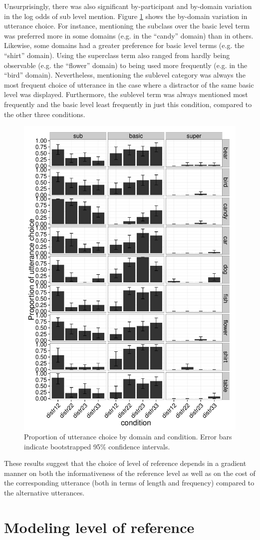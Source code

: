 \documentclass[10pt,letterpaper]{article}
\newcommand{\figref}[1]{Figure \ref{#1}}
\begin{document}
Unsurprisingly, there was also significant by-participant and by-domain variation in the log odds of sub level mention. \figref{fig:domains} shows the by-domain variation in utterance choice. For instance, mentioning the subclass over the basic level term was preferred more in some domains (e.g. in the ``candy'' domain) than in others. Likewise, some domains had a greater preference for basic level terms (e.g. the ``shirt'' domain). Using the superclass term also ranged from hardly being observable (e.g. the ``flower'' domain) to being used more frequently (e.g. in the ``bird'' domain). Nevertheless, mentioning the sublevel category was always the most frequent choice of utterance in the case where a distractor of the same basic level was displayed. Furthermore, the sublevel term was always mentioned most frequently and the basic level least frequently in just this condition, compared to the other three conditions.


\begin{figure}[ht!]
\centering
\includegraphics[width=.5\textwidth]{graphs/results-bydomain}
\caption{Proportion of utterance choice by domain and condition. Error bars indicate bootstrapped 95\% confidence intervals.}
\label{fig:domains}
\end{figure}

These results suggest that the choice of level of reference depends in a gradient manner on both the informativeness of the reference level as well as on the cost of the corresponding utterance (both in terms of length and frequency) compared to the alternative utterances.




\section{\bf Modeling level of reference}
\end{document}
